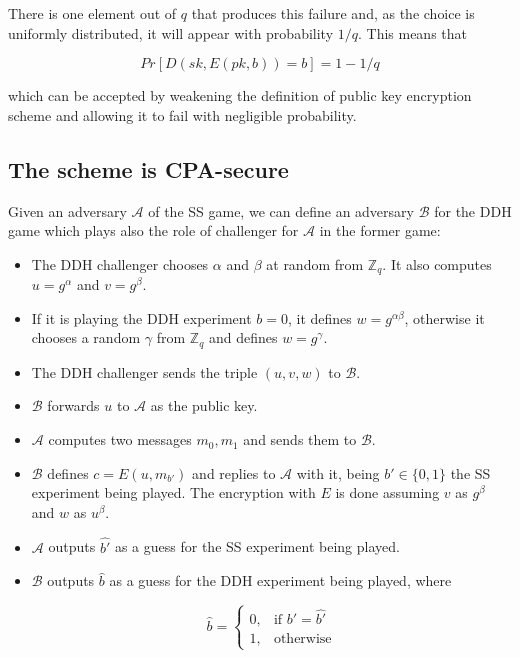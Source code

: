 \documentclass{article}
\begin{document}
There is one element out of $q$ that produces this failure
and, as the choice is uniformly distributed, it will appear with
probability $1 / q$. This means that

$$Pr[D(sk, E(pk, b)) = b] = 1 - 1/q$$

which can be accepted by weakening the definition of public 
key encryption scheme and allowing it to fail with negligible
probability.

\subsection{The scheme is CPA-secure}

Given an adversary $\mathcal{A}$ of the SS game, we can define 
an adversary $\mathcal{B}$ for the DDH game which plays also the
role of challenger for $\mathcal{A}$ in the former game:

\begin{itemize}
  \item The DDH challenger chooses $\alpha$ and $\beta$ at random
    from $\mathbb{Z}_q$. It also computes $u = g^\alpha$ and 
    $v = g^\beta$.

  \item If it is playing the DDH experiment $b=0$, it defines
    $w=g^{\alpha\beta}$, otherwise it chooses a random
    $\gamma$ from $\mathbb{Z}_q$ and defines $w=g^\gamma$.

  \item The DDH challenger sends the triple $(u, v, w)$
    to $\mathcal{B}$.

  \item $\mathcal{B}$ forwards $u$ to $\mathcal{A}$ as the public key.

  \item $\mathcal{A}$ computes two messages $m_0, m_1$ and sends
      them to $\mathcal{B}$.

  \item $\mathcal{B}$ defines $c=E(u, m_{b'})$ and replies to $\mathcal{A}$
        with it, being $b' \in \{0,1\}$ the SS experiment being played. The 
        encryption with $E$ is done assuming $v$ as $g^\beta$ and $w$ as
        $u^\beta$.

  \item $\mathcal{A}$ outputs $\hat{b'}$ as a guess for the SS experiment
    being played.
  \item $\mathcal{B}$ outputs $\hat{b}$ as a guess for the DDH experiment
    being played, where 

    $$\hat{b} = \begin{cases} 
      0, & \text{if } b' = \hat{b'} \\
      1, & \text{otherwise}
    \end{cases} $$
\end{itemize}
\end{document}
